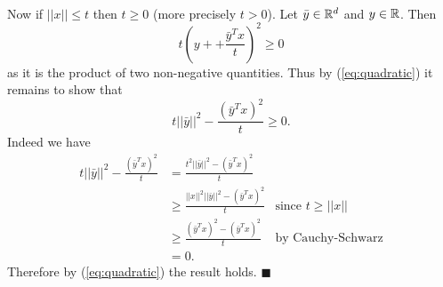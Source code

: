 \documentclass[letterpaper,12pt,oneside,onecolumn]{article}
\begin{document}
\paragraph{}
Now if $||x|| \leq t$ then $t \geq 0$ (more precisely $t > 0$). Let $\bar{y} \in \mathbb{R}^d$ and $y \in \mathbb{R}$. Then $$t(y++\frac{\bar{y}^Tx}{t})^2 \geq 0$$
as it is the product of two non-negative quantities. Thus by (\ref{eq:quadratic}) it remains to show that
$$t||\bar{y}||^2 - \frac{(\bar{y}^Tx)^2}{t} \geq 0.$$
Indeed we have
\begin{align*}
t||\bar{y}||^2 - \frac{(\bar{y}^Tx)^2}{t} &= \frac{t^2||\bar{y}||^2 - (\bar{y}^Tx)^2}{t} \\
&\geq \frac{||x||^2||\bar{y}||^2 - (\bar{y}^Tx)^2}{t}  &\text{since $t \geq ||x||$}\\
&\geq \frac{(\bar{y}^Tx)^2 - (\bar{y}^Tx)^2}{t} &\text{by Cauchy-Schwarz} \\
&= 0.
\end{align*}
Therefore by (\ref{eq:quadratic}) the result holds. $\blacksquare$
\end{document}
